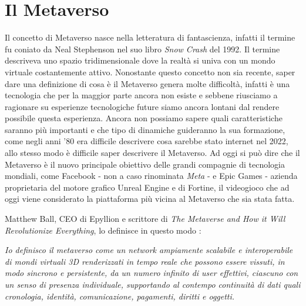


\section{Il Metaverso}

    Il concetto di Metaverso nasce nella letteratura di fantascienza, infatti il termine fu coniato da Neal Stephenson nel suo libro \textit{Snow Crash} del 1992. 
    Il termine descriveva uno spazio tridimensionale dove la realtà si univa con un mondo virtuale costantemente attivo.
    Nonostante questo concetto non sia recente, saper dare una definizione di cosa è il Metaverso genera molte difficoltà, infatti è una tecnologia che per la maggior parte ancora non esiste e sebbene riusciamo a ragionare su esperienze tecnologiche future siamo ancora lontani dal rendere possibile questa esperienza.
    Ancora non possiamo sapere quali caratteristiche saranno più importanti e che tipo di dinamiche guideranno la sua formazione, come negli anni '80 era difficile descrivere cosa sarebbe stato internet nel 2022, allo stesso modo è difficile saper descrivere il Metaverso.
    Ad oggi si può dire che il Metaverso è il nuovo principale obiettivo delle grandi compagnie di tecnologia mondiali, come Facebook - non a caso rinominata \textit{Meta} - e Epic Games - azienda proprietaria del motore grafico Unreal Engine e di Fortine, il videogioco che ad oggi viene considerato la piattaforma più vicina al Metaverso che sia stata fatta.

    Matthew Ball, CEO di Epyllion e scrittore di \textit{The Metaverse and How it Will Revolutionize Everything}, lo definisce in questo modo \cite{Ball2022}: 

    \begin{displayquote}
        \textit{Io definisco il metaverso come un network ampiamente scalabile e interoperabile di mondi virtuali 3D renderizzati in tempo reale che possono essere vissuti, in modo sincrono e persistente, da un numero infinito di user effettivi, ciascuno con un senso di presenza individuale, supportando al contempo continuità di dati quali cronologia, identità, comunicazione, pagamenti, diritti e oggetti.}
    \end{displayquote}

